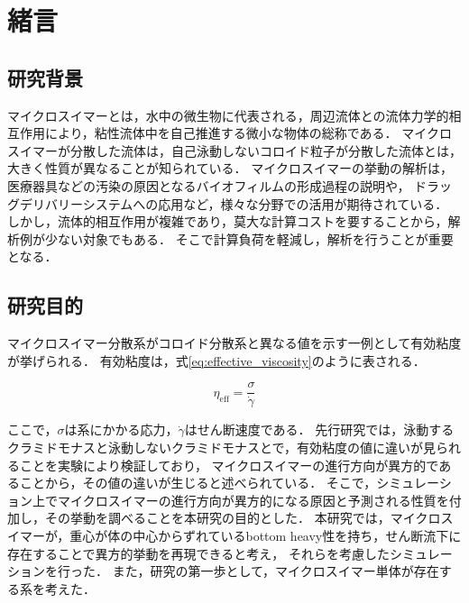 \documentclass[11pt, a4j, dvipdfmx]{jarticle}
\begin{document}
\section{緒言}

\subsection{研究背景}
\par
マイクロスイマーとは，水中の微生物に代表される，周辺流体との流体力学的相互作用により，粘性流体中を自己推進する微小な物体の総称である．
マイクロスイマーが分散した流体は，自己泳動しないコロイド粒子が分散した流体とは，大きく性質が異なることが知られている．
マイクロスイマーの挙動の解析は，医療器具などの汚染の原因となるバイオフィルムの形成過程の説明や，
ドラッグデリバリーシステムへの応用など，様々な分野での活用が期待されている．
しかし，流体的相互作用が複雑であり，莫大な計算コストを要することから，解析例が少ない対象でもある．
そこで計算負荷を軽減し，解析を行うことが重要となる．


\subsection{研究目的}
\par
マイクロスイマー分散系がコロイド分散系と異なる値を示す一例として有効粘度が挙げられる．
有効粘度は，式\eqref{eq:effective_viscosity}のように表される．

    \begin{equation}
        \eta_\mathrm{eff} = \frac{\sigma}{\dot{\gamma}}
        \label{rq:effective_viscosity}
    \end{equation}

\noindent
ここで，$\sigma$は系にかかる応力，$\dot{\gamma}$はせん断速度である．
先行研究では，泳動するクラミドモナスと泳動しないクラミドモナスとで，有効粘度の値に違いが見られることを実験により検証しており，
マイクロスイマーの進行方向が異方的であることから，その値の違いが生じると述べられている．
そこで，シミュレーション上でマイクロスイマーの進行方向が異方的になる原因と予測される性質を付加し，その挙動を調べることを本研究の目的とした．
本研究では，マイクロスイマーが，重心が体の中心からずれているbottom heavy性を持ち，せん断流下に存在することで異方的挙動を再現できると考え，
それらを考慮したシミュレーションを行った．
また，研究の第一歩として，マイクロスイマー単体が存在する系を考えた．
\end{document}
